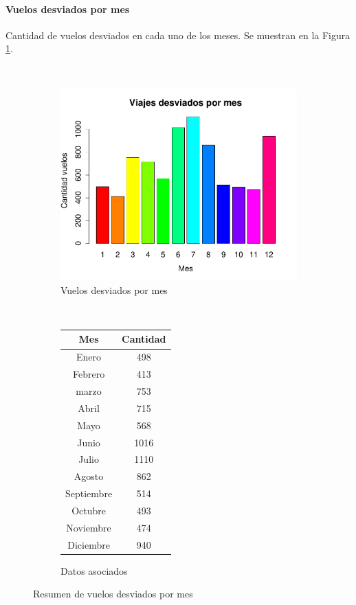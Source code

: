 \documentclass[12pt]{article}
\numberwithin{equation}{section}
\numberwithin{table}{section}
\numberwithin{figure}{section}
\begin{document}
\paragraph{Vuelos desviados por mes}
Cantidad de vuelos desviados en cada uno de los meses.
Se muestran en la Figura \ref{fig:desviados-por-mes}.

\begin{figure}
        \centering
        ~
        \begin{subfigure}[b]{0.6\textwidth}
                \includegraphics[width=1\columnwidth]{imagenes/desviados/viajes-desviados-por-mes}
                \caption{Vuelos desviados por mes}
        \end{subfigure}
        ~
        \begin{subfigure}[b]{0.3\textwidth}
\begin{tabular}{@{}cc@{}}
\toprule
\textbf{Mes} & \textbf{Cantidad} \\ \midrule
Enero        & 498               \\
Febrero      & 413               \\
marzo        & 753               \\
Abril        & 715               \\
Mayo         & 568               \\
Junio        & 1016              \\
Julio        & 1110              \\
Agosto       & 862               \\
Septiembre   & 514               \\
Octubre      & 493               \\
Noviembre    & 474               \\
Diciembre    & 940               \\ \bottomrule
\end{tabular}
                \caption{Datos asociados}
        \end{subfigure}
        \caption{Resumen de vuelos desviados por mes}
        \label{fig:desviados-por-mes}
\end{figure}
\end{document}
